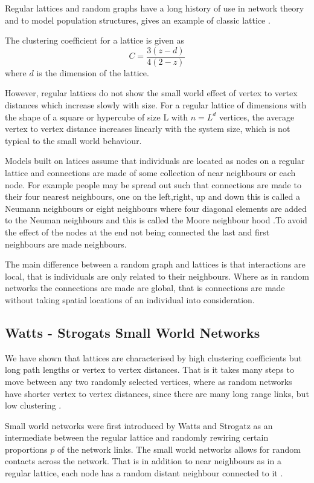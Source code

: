 Regular lattices and random graphs have a long history of use in network theory and to model population structures,  gives an example of classic lattice \citep{harris1974contact}.

The clustering coefficient for a lattice is given as  
\begin{equation}
C = \frac{3(z -d)}{4(2-z)}
\end{equation}
where $d$ is the dimension of the lattice.

However, regular lattices do not show the small world effect of vertex to vertex distances which increase slowly with size. For a regular lattice of dimensions with the shape of a square or hypercube of size L with $n = L^d$ vertices, the average vertex to vertex distance increases linearly with the system size, which is not typical to the small world behaviour. 


 Models built on latices assume that individuals are located as nodes on a regular lattice and connections are made of some collection of near neighbours or each node. For example people may be spread out such that connections are made to their four nearest neighbours, one on the left,right, up and down this is called a Neumann neighbours  or eight neighbours where four diagonal elements are added to the Neuman neighbours and this is called the Moore neighbour hood \citep{lloyd2006infection}.To avoid the effect of the nodes at the end not being connected the last and first neighbours are made neighbours.

The main difference between a random graph and lattices is that interactions are local, that is individuals are only related to their neighbours. Where as in random networks the connections are made are global, that is connections are made without taking spatial locations of an individual into consideration. 

\subsection{Watts - Strogats Small World Networks}
We have shown that lattices are characterised by high clustering coefficients but long path lengths or vertex to vertex distances. That is it takes many steps to move between any two randomly selected vertices, where as random networks have shorter vertex to vertex distances, since there are many long range links, but low clustering \citep{keeling2005networks}.


Small world networks  were first introduced by Watts and Strogatz as an intermediate between the regular lattice and randomly rewiring certain proportions $p$ of the network links\citep{watts1998collective}. The small world networks allows for random contacts across the network. That is in addition to near neighbours as in a regular lattice, each node has a random distant neighbour connected to it \citep{watts1998collective}.


